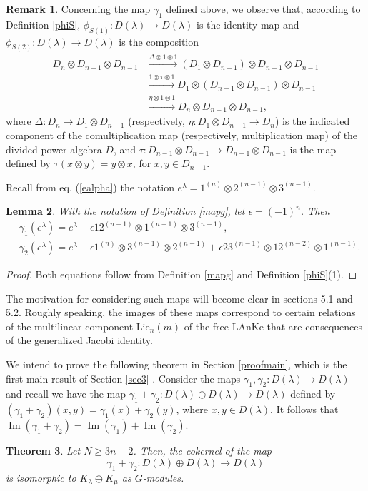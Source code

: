 \documentclass[11pt]{amsart}
\newtheorem{thm}{Theorem}[section]
\newtheorem{lem}[thm]{Lemma}
\theoremstyle{definition}
\newtheorem{rem}[thm]{Remark}
\numberwithin{equation}{section}
\DeclareMathOperator{\Ima}{Im}
\begin{document}
\begin{rem}\label{gamma1} Concerning the map $\gamma_1$ defined above, we observe that, according to Definition \ref{phiS}, $\phi_{S(1)} :D(\lambda) \to D(\lambda)$ is the identity map and $\phi_{S(2)} :D(\lambda) \to D(\lambda)$ is the composition \begin{align*}  D_n \otimes D_{n-1} \otimes D_{n-1} &\xrightarrow {\Delta \otimes 1 \otimes 1} (D_1 \otimes D_{n-1}) \otimes D_{n-1} \otimes D_{n-1} \\&\xrightarrow{1 \otimes \tau \otimes 1}  D_1 \otimes (D_{n-1} \otimes D_{n-1}) \otimes D_{n-1} \\&\xrightarrow{\eta \otimes 1 \otimes 1}  D_n \otimes D_{n-1} \otimes D_{n-1}, \end{align*}
	where $\Delta: D_{n} \to D_1 \otimes D_{n-1}$ (respectively, $\eta: D_{1} \otimes D_{n-1} \to D_{n}$) is the indicated component of the comultiplication map (respectively, multiplication map) of the divided power algebra $D$, and $\tau: D_{n-1} \otimes  D_{n-1} \to D_{n-1} \otimes  D_{n-1}$ is the map defined by $\tau(x \otimes y) =y \otimes x$, for $x, y \in D_{n-1} $.
\end{rem}

Recall from eq. (\ref{ealpha}) the notation $e^{\lambda}=1^{(n)} \otimes 2^{(n-1)} \otimes 3^{(n-1)}$.


\begin{lem}\label{ge} With the notation of Definition \ref{mapg}, let $\epsilon = (-1)^n$. Then \begin{align}\label{gammae}&\gamma_1(e^{\lambda})= e^{\lambda} +\epsilon12^{(n-1)} \otimes 1^{(n-1)} \otimes 3^{(n-1)}, \\ \label{phie}&\gamma_2(e^{\lambda})= e^{\lambda} +\epsilon1^{(n)} \otimes 3^{(n-1)} \otimes 2^{(n-1)}+\epsilon23^{(n-1)} \otimes 12^{(n-2)} \otimes 1^{(n-1)}.\end{align} \end{lem}
\begin{proof}Both equations follow from Definition \ref{mapg} and Definition \ref{phiS}(1).
	\end{proof}

The motivation for considering such maps will become clear in sections 5.1 and 5.2. Roughly speaking, the images of these maps correspond to certain relations of the multilinear component $\text{Lie}_n(m)$ of the free LAnKe that are consequences of the generalized Jacobi identity. 

We intend to prove the following theorem in Section \ref{proofmain}, which is the first main result of Section \ref{sec3} . Consider the maps $\gamma_1, \gamma_2 : D(\lambda) \to D(\lambda)$ and recall we have the map  $\gamma_1 +\gamma_2 : D(\lambda) \oplus D(\lambda) \to D(\lambda)$ defined by $(\gamma_1 +\gamma_2)(x,y) =\gamma_1(x) + \gamma_2(y)$, where $x,y \in D(\lambda)$. It follows that $\Ima(\gamma_1 +\gamma_2)=\Ima(\gamma_1)+\Ima(\gamma_2)$. \begin{thm}\label{main1}
	Let $N \ge 3n-2$. Then, the cokernel of the map \[\gamma_1 +\gamma_2 : D(\lambda) \oplus D(\lambda) \to D(\lambda) \] is isomorphic to $K_{\lambda} \oplus K_{\mu}$ as $G$-modules.
\end{thm}
\end{document}
